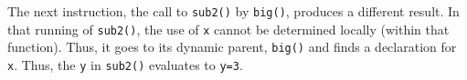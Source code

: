 The next instruction, the call to \texttt{sub2()} by \texttt{big()}, produces a different result.
In that running of \texttt{sub2()}, the use of \texttt{x} cannot be determined locally (within that function).
Thus, it goes to its dynamic parent, \texttt{big()} and finds a declaration for \texttt{x}.
Thus, the \texttt{y} in \texttt{sub2()} evaluates to \texttt{y=3}.


